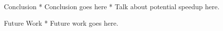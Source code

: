 \begin{block}{Conclusion}
* Conclusion goes here
* Talk about potential speedup here.
\end{block}

\vspace{1ex}

\begin{block}{Future Work}
* Future work goes here.
\end{block}
